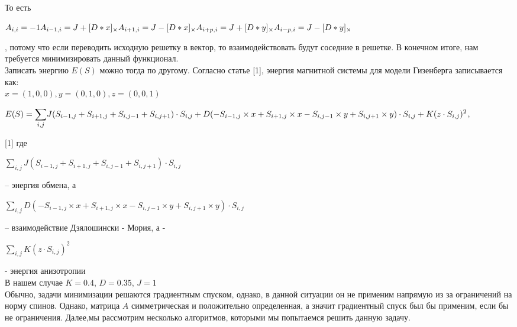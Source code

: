 \documentclass[ 12pt,x11names]{article}
\begin{document}
    \\
    То есть  \begin{center} $A_{i, i} = -1 \\ A_{i - 1, i} =  J + [D*x]_\times \\
    A_{i+1, i} =  J - [D*x]_\times \\
    A_{i + p, i} =  J + [D*y]_\times \\
    A_{i - p , i} =  J -  [D*y]_\times$
     \end{center}, потому что если переводить исходную решетку в вектор, то взаимодействовать будут соседние в решетке.
    В конечном итоге, нам требуется минимизировать данный функционал.\\
    Записать энергию $E(S)$ можно тогда по другому.
    Согласно статье [1], энергия магнитной системы для модели Гизенберга записывается как:\\
    $x = (1,0, 0), y = (0,1, 0), z =(0, 0 , 1)$\\
        \begin{center}
    $E(S) = \displaystyle{\sum_{i, j}}  J (S_{i - 1, j} + S_{i + 1, j} + S_{i, j - 1} + S_{i, j + 1}) \cdot S_{i,j} + \\
    D  (-S_{i - 1, j} \times x  + S_{i + 1, j} \times x - S_{i, j - 1} \times y + S_{i, j + 1} \times y)\cdot S_{i,j}
    + \\
    K  (z \cdot S_{i,j}) ^ 2$,\\
    \end{center}[1]
    где
     \begin{center}
    $\displaystyle{\sum_{i, j}} J (S_{i - 1, j} + S_{i + 1, j} + S_{i, j - 1} + S_{i, j + 1}) \cdot S_{i,j}$\end{center} -- энергия обмена, а \begin{center}
    $\displaystyle{\sum_{i, j}} D  (-S_{i - 1, j} \times x  + S_{i + 1, j} \times x - S_{i, j - 1} \times y + S_{i, j + 1} \times y)\cdot S_{i,j}$\end{center}  -- взаимодействие Дзялошински - Мория, а - \begin{center}
    $\displaystyle{\sum_{i, j}} K  (z \cdot S_{i,j}) ^ 2$\end{center} - энергия анизотропии\\
    В нашем случае $K = 0.4$, $D = 0.35$, $J = 1$\\
    Обычно, задачи минимизации решаются градиентным спуском, однако, в данной ситуации он не применим напрямую из за ограничений на норму спинов.
    Однако, матрица $A$ симметрическая и положительно определенная, а значит градиентный спуск был бы применим, если бы не ограничения.
    Далее,мы рассмотрим несколько алгоритмов, которыми мы попытаемся решить данную задачу.
    \newpage
\end{document}
